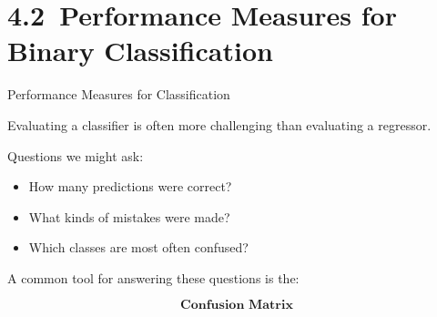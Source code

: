 \documentclass[aspectratio=169]{beamer}
\begin{document}

\section{4.2~Performance Measures for Binary Classification}

\begin{frame}{Performance Measures for Classification}
	
	Evaluating a classifier is often more challenging than evaluating a regressor.
	
	\vspace{0.5em}
	
	Questions we might ask:
	
	\begin{itemize}
		\item How many predictions were correct?
		\item What kinds of mistakes were made?
		\item Which classes are most often confused?
	\end{itemize}
	
	\vspace{0.5em}
	
	A common tool for answering these questions is the:
	
	\[
	\textbf{Confusion Matrix}
	\]
	
\end{frame}

\end{document}
